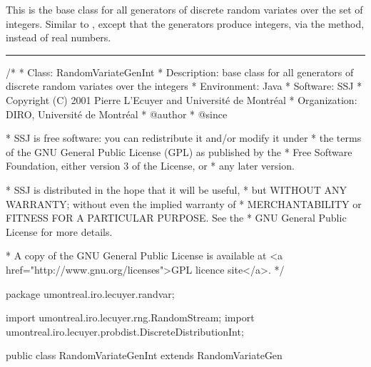 
This is the base class for all generators of discrete random variates
over the set of integers.
Similar to , except that the generators
produce integers, via the  method, instead of real numbers.


\bigskip\hrule

\begin{code}
\begin{hide}
/*
 * Class:        RandomVariateGenInt
 * Description:  base class for all generators of discrete random variates
over the integers
 * Environment:  Java
 * Software:     SSJ 
 * Copyright (C) 2001  Pierre L'Ecuyer and Université de Montréal
 * Organization: DIRO, Université de Montréal
 * @author       
 * @since

 * SSJ is free software: you can redistribute it and/or modify it under
 * the terms of the GNU General Public License (GPL) as published by the
 * Free Software Foundation, either version 3 of the License, or
 * any later version.

 * SSJ is distributed in the hope that it will be useful,
 * but WITHOUT ANY WARRANTY; without even the implied warranty of
 * MERCHANTABILITY or FITNESS FOR A PARTICULAR PURPOSE.  See the
 * GNU General Public License for more details.

 * A copy of the GNU General Public License is available at
   <a href="http://www.gnu.org/licenses">GPL licence site</a>.
 */
\end{hide}
package umontreal.iro.lecuyer.randvar;\begin{hide}
import umontreal.iro.lecuyer.rng.RandomStream;
import umontreal.iro.lecuyer.probdist.DiscreteDistributionInt;\end{hide}

public class RandomVariateGenInt extends RandomVariateGen\begin{hide} {

\end{hide}
\end{code}

